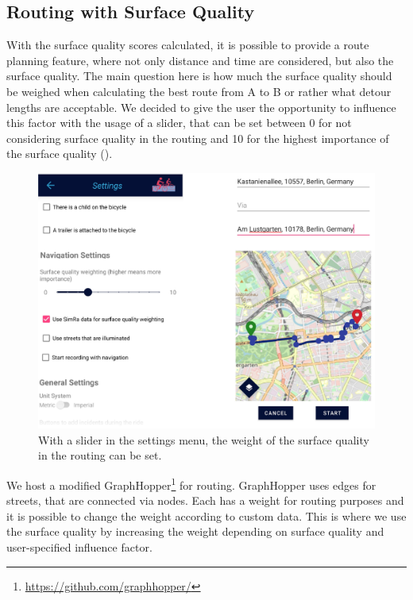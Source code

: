 \subsection{Routing with Surface Quality}
\label{subsec:routing_with_surface_quality}
With the surface quality scores calculated, it is possible to provide a route planning feature, where not only distance and time are considered, but also the surface quality.
The main question here is how much the surface quality should be weighed when calculating the best route from A to B or rather what detour lengths are acceptable.
We decided to give the user the opportunity to influence this factor with the usage of a slider, that can be set between 0 for not considering surface quality in the routing and 10 for the highest importance of the surface quality ().
 \begin{figure}
    \centering
    \includegraphics[width=0.7\columnwidth]{fig/routing_settings_2.png}
    \caption{%
With a slider in the settings menu, the weight of the surface quality in the routing can be set.}%
    \label{fig:routing}
\end{figure}
We host a modified GraphHopper\footnote{\url{https://github.com/graphhopper/}} for routing.
GraphHopper uses edges for streets, that are connected via nodes.
Each has a weight for routing purposes and it is possible to change the weight according to custom data.
This is where we use the surface quality by increasing the weight depending on surface quality and user-specified influence factor.

